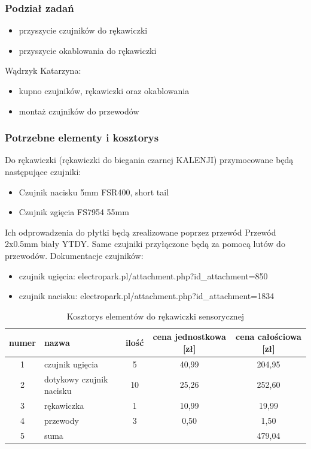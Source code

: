 \documentclass{article}
\begin{document}
\subsubsection{Podział zadań}
\begin{itemize}
    \item przyszycie czujników do rękawiczki
    \item przyszycie okablowania do rękawiczki
\end{itemize}
Wądrzyk Katarzyna:
\begin{itemize}
    \item kupno czujników, rękawiczki oraz okablowania
    \item montaż czujników do przewodów
\end{itemize}
\subsubsection{Potrzebne elementy i kosztorys}
Do rękawiczki (rękawiczki do biegania czarnej KALENJI) przymocowane będą następujące czujniki:
\begin{itemize}
    \item Czujnik nacisku 5mm FSR400, short tail
    \item Czujnik zgięcia FS7954 55mm
\end{itemize}
Ich odprowadzenia do płytki będą zrealizowane poprzez przewód Przewód 2x0.5mm biały YTDY.
Same czujniki przyłączone będą za pomocą lutów do przewodów.
Dokumentacje czujników:

\begin{itemize}
  \item czujnik ugięcia: electropark.pl/attachment.php?id\textit{\_}attachment=850
  \item czujnik nacisku: electropark.pl/attachment.php?id\textit{\_}attachment=1834

\end{itemize}

\begin{table}[ht!]
\centering
\caption{Kosztorys elementów do rękawiczki sensorycznej}
\begin{tabular}{|c|l|c|c|c|}
\hline
    numer & nazwa & ilość & cena jednostkowa [zł] & cena całościowa [zł] \\
 \hline
    1 & czujnik ugięcia & 5 & 40,99 & 204,95 \\
    2 & dotykowy czujnik nacisku & 10 & 25,26 & 252,60 \\
    3 & rękawiczka & 1 & 10,99 & 19,99 \\
    4 & przewody & 3 & 0,50 & 1,50 \\
    \hline
    5 & suma & & & 479,04\\
    \hline
\end{tabular}
\label{tab:rekawiczka}
\end{table}
\end{document}
